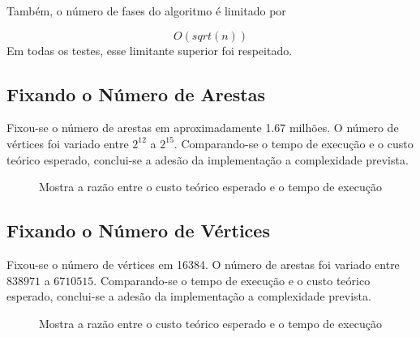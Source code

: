 \documentclass{iiufrgs}
\begin{document}
Também, o número de fases do algoritmo é limitado por 

\begin{equation*}
\label{eq:ql}
O(sqrt(n))
\end{equation*}
Em todas os testes, esse limitante superior foi respeitado.

\subsection{Fixando o Número de Arestas}
Fixou-se o número de arestas em aproximadamente 1.67 milhões. O número de vértices foi variado entre $2^{12}$ a $2^{15}$. Comparando-se o tempo de execução e o custo teórico
esperado, conclui-se a adesão da implementação a complexidade prevista.

\begin{figure}[H]
\centering
{}
\caption{Mostra a raz\~ao entre o custo teórico esperado e o tempo de execuç\~ao}
\label{fig:comparison}
\end{figure}

\subsection{Fixando o Número de Vértices}
Fixou-se o número de vértices em 16384. O número de arestas foi variado entre $838971$ a $6710515$. Comparando-se o tempo de execução e o custo teórico 
esperado, conclui-se a adesão da implementação a complexidade prevista.

\begin{figure}[H]
\centering
{}
\caption{Mostra a raz\~ao entre o custo teórico esperado e o tempo de execuç\~ao}
\label{fig:comparison}
\end{figure}
\end{document}
